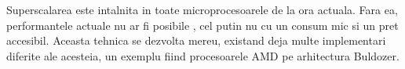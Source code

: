 Superscalarea este intalnita in toate microprocesoarele de la ora actuala. Fara ea, performantele
actuale nu ar fi posibile , cel putin nu cu un consum mic si un pret accesibil. Aceasta tehnica se
dezvolta mereu, existand deja multe implementari diferite ale acesteia, un exemplu fiind
procesoarele AMD pe arhitectura Buldozer.


